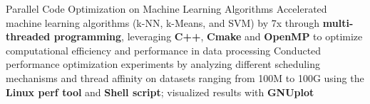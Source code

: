 
\resumeProjEntry
{Parallel Code Optimization on Machine Learning Algorithms}
{}
{
    \resumeItemListStart
        \resumeItem
        {Accelerated machine learning algorithms (k-NN, k-Means, and SVM) by 7x through \textbf{multi-threaded programming}, leveraging \textbf{C++}, \textbf{Cmake} and \textbf{OpenMP} to optimize computational efficiency and performance in data processing}
        \resumeItem
        {Conducted performance optimization experiments by analyzing different scheduling mechanisms and thread affinity on datasets ranging from 100M to 100G using the \textbf{Linux perf tool} and \textbf{Shell script}; visualized results with \textbf{GNUplot}}
    \resumeItemListEnd
}





